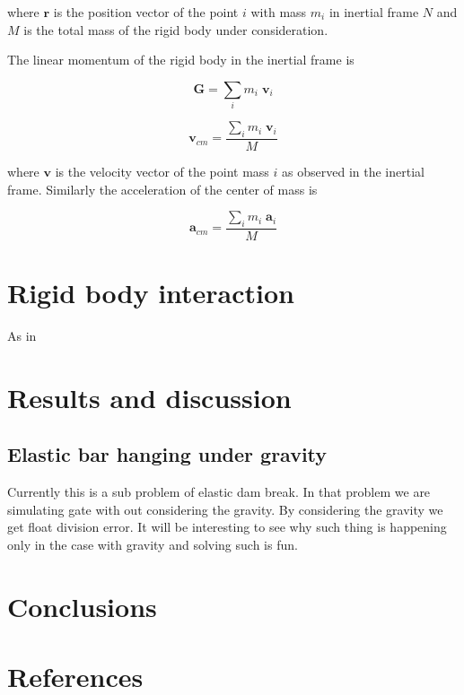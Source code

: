 \documentclass[preprint,12pt]{elsarticle}
\newcommand{\ten}[1]{\ensuremath{\mathbf{#1}}}
\begin{document}
\noindent where $\ten{r}$ is the position vector of the point $i$ with mass
$m_i$ in inertial frame $N$ and $M$ is the total mass of the rigid body under
consideration.


The linear momentum of the rigid body in the inertial frame is


\begin{equation}
  \label{eq:lin-mom-of-rigid-body}
  \ten{G} = \sum_i m_i \; \ten{v}_i
\end{equation}


\begin{equation}
  \label{eq:center-of-mass-velocity}
  \ten{v}_{cm} = \frac{\sum_i m_i \; \ten{v}_i}{M}
\end{equation}

\noindent where $\ten{v}$ is the velocity vector of the point mass $i$ as
observed in the inertial frame. Similarly the acceleration of the center of
mass is


\begin{equation}
  \label{eq:acceleration-of-rigid-body}
  \ten{a}_{cm} = \frac{\sum_i m_i \; \ten{a}_i}{M}
\end{equation}



\section{Rigid body interaction}
\label{sec:rigid-body-inter}

As in




\section{Results and discussion}
\label{sec:results}

\subsection{Elastic bar hanging under gravity}
\label{sec:elastic-bar-hanging}


Currently this is a sub problem of elastic dam break. In that problem we are
simulating gate with out considering the gravity. By considering the gravity
we get float division error. It will be interesting to see why such thing is
happening only in the case with gravity and solving such is fun.



\section{Conclusions}
\label{sec:conclusions}


\section*{References}


\end{document}
